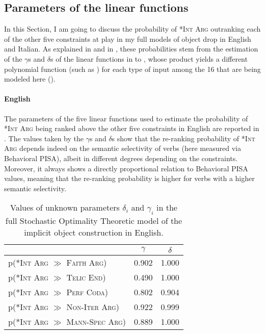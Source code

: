 \subsection{Parameters of the linear functions} 

In this Section, I am going to discuss the probability of \textsc{*Int Arg} outranking each of the other five constraints at play in my full models of object drop in English and Italian. As explained in  and in , these probabilities stem from the estimation of the $\gamma$s and $\delta$s of the linear functions in  to , whose product yields a different polynomial function (such as ) for each type of input among the 16 that are being modeled here ().

\paragraph{English} 
The parameters of the five linear functions used to estimate the probability of \textsc{*Int Arg} being ranked above the other five constraints in English are reported in . The values taken by the $\gamma$s and $\delta$s show that the re-ranking probability of \textsc{*Int Arg} depends indeed on the semantic selectivity of verbs (here measured via Behavioral PISA), albeit in different degrees depending on the constraints. Moreover, it always shows a directly proportional relation to Behavioral PISA values, meaning that the re-ranking probability is higher for verbs with a higher semantic selectivity.

\begin{table}[htb] %
\caption{Values of unknown parameters $\delta_i$ and $\gamma_i$ in the full Stochastic Optimality Theoretic model of the implicit object construction in English.}
\begin{tabular}{l|cc}
                                                                                & $\gamma$ & $\delta$ \\
                                                                                \hline
p(\textsc{*Int Arg} $\gg$ \textsc{Faith Arg}) & 0.902        & 1.000        \\
p(\textsc{*Int Arg} $\gg$ \textsc{Telic End}) & 0.490        & 1.000        \\
p(\textsc{*Int Arg} $\gg$ \textsc{Perf Coda})  & 0.802        & 0.904        \\
p(\textsc{*Int Arg} $\gg$ \textsc{Non-Iter Arg}) & 0.922        & 0.999        \\
p(\textsc{*Int Arg} $\gg$ \textsc{Mann-Spec Arg}) & 0.889        & 1.000       
\end{tabular}
\end{table}

